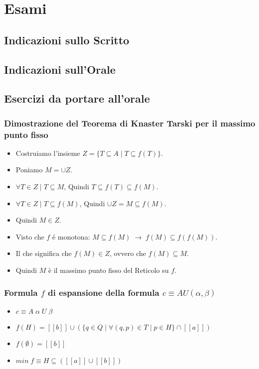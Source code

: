 \chapter{Esami}

\section{Indicazioni sullo Scritto}

\section{Indicazioni sull'Orale}

\section{Esercizi da portare all'orale}

\subsection{Dimostrazione del Teorema di Knaster Tarski per il massimo punto fisso}

\begin{itemize}
    \item Costruiamo l’insieme $Z = \{ T \subseteq A \; | \; T \subseteq f(T) \}$.
    \item Poniamo $M = \cup Z$.
    \item $\forall T \in Z \; | \; T \subseteq M$, Quindi $T \subseteq f(T) \subseteq f(M)$.
    \item $\forall T \in Z \; | \; T \subseteq f(M)$, Quindi $\cup Z = M \subseteq f(M)$.
    \item Quindi $M \in Z$.
    \item Visto che $f$ \'e monotona: $M \subseteq f(M) \; \rightarrow \; f(M) \subseteq f(f(M))$.
    \item Il che significa che $f(M) \in Z$, ovvero che $f(M) \subseteq M$.
    \item Quindi $M$ \`e il massimo punto fisso del Reticolo su $f$.
\end{itemize}

\subsection{Formula $f$ di espansione della formula $c \equiv AU(\alpha, \beta)$}

\begin{itemize}
    \item $c \equiv A \; \alpha \; U \; \beta$
    \item $f(H) = [[b]] \cup (\{q \in Q \; | \; \forall(q,p) \in T \; | \; p \in H\} \cap [[a]])$
    \item $f(\emptyset) = [[b]]$
    \item $min \; f \equiv H \subseteq ([[a]] \cup [[b]])$
\end{itemize}
